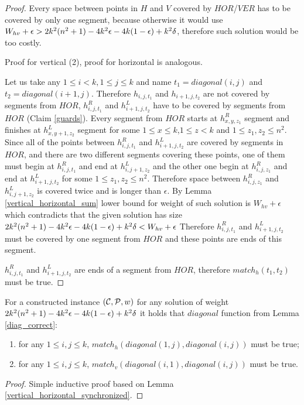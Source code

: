\begin{proof}
Every space between points in $H$ and $V$ covered by $HOR$/$VER$
has to be covered by only one segment, because otherwise it would
use $W_{hv} + \epsilon > 2k^2(n^2+1) - 4k^2\epsilon -4k(1-\epsilon) +k^2\delta$,
therefore such solution would be too costly.

Proof for vertical (2), proof for horizontal is analogous.

Let us take any $1 \le i < k, 1 \le j \le k$
and name $t_1 = diagonal(i, j)$ and $t_2 = diagonal(i+1, j)$.
Therefore $h_{i,j,t_1}$ and $h_{i+1,j,t_2}$
are not covered by segments from $HOR$,
$h^R_{i,j,t_1}$ and $h^L_{i+1,j,t_2}$
have to be covered by segments from $HOR$ (Claim \ref{guards}).
Every segment from $HOR$ starts at $h^R_{x,y,z_1}$
segment and finishes at $h^L_{x,y+1,z_2}$ segment for some
$1 \le x \le k$,$1 \le z < k$ and $1 \le z_1, z_2 \le n^2$.
Since all of the points between $h^R_{i,j,t_1}$ and $h^L_{i+1,j,t_2}$
are covered by segments in $HOR$,
and there are two different segments covering
these points, one of them must begin
at $h^R_{i,j,t_1}$ and end at $h^L_{i,j+1,z_2}$
and the other one begin at $h^R_{i,j,z_1}$
and end at $h^L_{i+1,j,t_2}$
for some $1 \le z_1, z_2 \le n^2$.
Therefore space between $h^R_{i,j,z_1}$ and $h^L_{i,j+1,z_2}$
is covered twice and is longer than $\epsilon$.
By Lemma \ref{vertical_horizontal_sum}
lower bound for weight of such solution is $W_{hv} + \epsilon$
which contradicts that the given solution has size $2k^2(n^2+1) - 4k^2\epsilon -4k(1-\epsilon) +k^2\delta < W_{hv} + \epsilon$
Therefore $h^R_{i,j,t_1}$ and $h^L_{i+1,j,t_2}$ must be covered
by one segment from $HOR$ and these points are ends of this segment.

$h^R_{i,j,t_1}$ and $h^L_{i+1,j,t_2}$
are ends of a segment from $HOR$,
therefore $match_h(t_1,t_2)$ must be true.
\end{proof}

\begin{corollary}
\label{vertical_horizontal_synchronized_inductive}
For a constructed instance $(\mathcal{C}, \mathcal{P}, w)$
for any solution of weight $2k^2(n^2+1) - 4k^2\epsilon -4k(1-\epsilon) +k^2\delta$ it holds that $diagonal$ function
from Lemma \ref{diag_correct}:
\begin{enumerate}
\item 
for any $1 \le i, j \le k$,
$match_h(diagonal(1, j),diagonal(i, j))$ must be true;
\item 
for any $1 \le i, j \le k$,
$match_v(diagonal(i, 1),diagonal(i, j))$ must be true.
\end{enumerate}
\end{corollary}
\begin{proof}
Simple inductive proof based on Lemma \ref{vertical_horizontal_synchronized}.
\end{proof}


